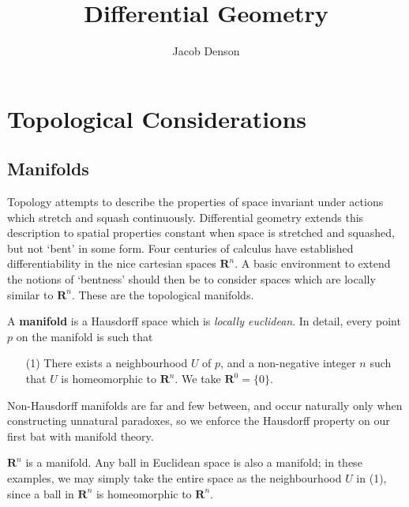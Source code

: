 

\title{Differential Geometry}
\author{Jacob Denson}



\maketitle
\tableofcontents
{}

\chapter{Topological Considerations}

\section{Manifolds}

Topology attempts to describe the properties of space invariant under actions which stretch and squash continuously. Differential geometry extends this description to spatial properties constant when space is stretched and squashed, but not `bent' in some form. Four centuries of calculus have established differentiability in the nice cartesian spaces $\mathbf{R}^n$. A basic environment to extend the notions of `bentness' should then be to consider spaces which are locally similar to $\mathbf{R}^n$. These are the topological manifolds.

\begin{definition}
    A {\bf manifold} is a Hausdorff space which is {\it locally euclidean}. In detail, every point $p$ on the manifold is such that
    \begin{enumerate}
        \item[(1)] There exists a neighbourhood $U$ of $p$, and a non-negative integer $n$ such that $U$ is homeomorphic to $\mathbf{R}^n$. We take $\mathbf{R}^0 = \{0\}$.
    \end{enumerate}
\end{definition}

Non-Hausdorff manifolds are far and few between, and occur naturally only when constructing unnatural paradoxes, so we enforce the Hausdorff property on our first bat with manifold theory.

\begin{example}
    $\mathbf{R}^n$ is a manifold. Any ball in Euclidean space is also a manifold; in these examples, we may simply take the entire space as the neighbourhood $U$ in (1), since a ball in $\mathbf{R}^n$ is homeomorphic to $\mathbf{R}^n$.
\end{example}

